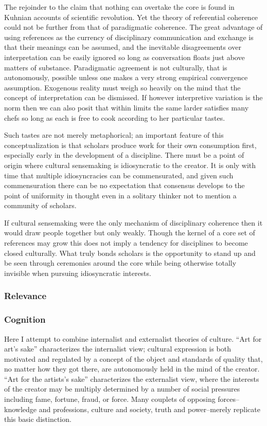 \documentclass [PhD] {uclathes}
\begin{document}
The rejoinder to the claim that nothing can overtake the core is found
in Kuhnian accounts of scientific revolution. Yet the theory of
referential coherence could not be further from that of paradigmatic
coherence. The great advantage of using references as the currency of
disciplinary communication and exchange is that their meanings can be
assumed, and the inevitable disagreements over interpretation can be
easily ignored so long as conversation floats just above matters of
substance. Paradigmatic agreement is not culturally, that is
autonomously, possible unless one makes a very strong empirical
convergence assumption. Exogenous reality must weigh so heavily on the
mind that the concept of interpretation can be dismissed. If however
interpretive variation is the norm then we can also posit that within
limits the same larder satisfies many chefs so long as each is free to
cook according to her particular tastes.

Such tastes are not merely metaphorical; an important feature of this
conceptualization is that scholars produce work for their own
consumption first, especially early in the development of a discipline.
There must be a point of origin where cultural sensemaking is
idiosyncratic to the creator. It is only with time that multiple
idiosyncracies can be commensurated, and given such commensuration there
can be no expectation that consensus develops to the point of uniformity
in thought even in a solitary thinker not to mention a community of
scholars.

If cultural sensemaking were the only mechanism of disciplinary
coherence then it would draw people together but only weakly. Though the
kernel of a core set of references may grow this does not imply a
tendency for disciplines to become closed culturally. What truly bonds
scholars is the opportunity to stand up and be seen through ceremonies
around the core while being otherwise totally invisible when pursuing
idiosyncratic interests.

\subsubsection{Relevance}\label{relevance}

\subsubsection{Cognition}\label{cognition}

Here I attempt to combine internalist and externalist theories of
culture. ``Art for art's sake'' characterizes the internalist view;
cultural expression is both motivated and regulated by a concept of the
object and standards of quality that, no matter how they got there, are
autonomously held in the mind of the creator. ``Art for the artists's
sake'' characterizes the externalist view, where the interests of the
creator may be multiply determined by a number of social pressures
including fame, fortune, fraud, or force. Many couplets of opposing
forces--knowledge and professions, culture and society, truth and
power--merely replicate this basic distinction.
\end{document}
